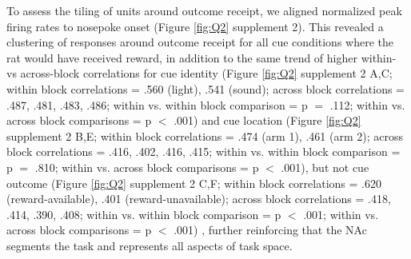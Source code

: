 \documentclass[11pt]{article}
\providecommand{\DIFadd}[1]{{\protect\color{red} \sf #1}} %
\providecommand{\DIFdel}[1]{} %
\providecommand{\DIFaddbegin}{} %
\providecommand{\DIFaddend}{} %
\providecommand{\DIFdelbegin}{} %
\providecommand{\DIFdelend}{} %
\newcommand{\DIFscaledelfig}{0.5}
\newlength{\DIFdelgraphicswidth} %
\newlength{\DIFdelgraphicsheight} %
\newcommand{\DIFaddincludegraphics}[2][]{{\color{red}\fbox{\DIFOincludegraphics[#1]{#2}}}} %
\newcommand{\DIFdelincludegraphics}[2][]{%
\sbox{\DIFdelgraphicsbox}{\DIFOincludegraphics[#1]{#2}}%
\settoboxwidth{\DIFdelgraphicswidth}{\DIFdelgraphicsbox} %
\settoboxtotalheight{\DIFdelgraphicsheight}{\DIFdelgraphicsbox} %
\scalebox{\DIFscaledelfig}{%
\parbox[b]{\DIFdelgraphicswidth}{\usebox{\DIFdelgraphicsbox}\\[-\baselineskip] \rule{\DIFdelgraphicswidth}{0em}}\llap{\resizebox{\DIFdelgraphicswidth}{\DIFdelgraphicsheight}{%
\setlength{\unitlength}{\DIFdelgraphicswidth}%
\begin{picture}(1,1)%
\thicklines\linethickness{2pt} %
{\color[rgb]{1,0,0}\put(0,0){\framebox(1,1){}}}%
{\color[rgb]{1,0,0}\put(0,0){\line( 1,1){1}}}%
{\color[rgb]{1,0,0}\put(0,1){\line(1,-1){1}}}%
\end{picture}%
}\hspace*{3pt}}} %
} %
\DeclareRobustCommand{\DIFaddbegin}{\DIFOaddbegin \let\includegraphics\DIFaddincludegraphics} %
\DeclareRobustCommand{\DIFaddend}{\DIFOaddend \let\includegraphics\DIFOincludegraphics} %
\DeclareRobustCommand{\DIFdelbegin}{\DIFOdelbegin \let\includegraphics\DIFdelincludegraphics} %
\DeclareRobustCommand{\DIFdelend}{\DIFOaddend \let\includegraphics\DIFOincludegraphics} %
\begin{document}
\DIFadd{To assess the tiling of units around outcome receipt, we aligned }\DIFaddend normalized peak firing rates to nosepoke onset \DIFdelbegin \DIFdel{, }\DIFdelend \DIFaddbegin \DIFadd{(Figure \ref{fig:Q2} supplement 2). This }\DIFaddend revealed a clustering of responses around outcome receipt for all cue conditions where the rat would have received reward\DIFdelbegin \DIFdel{(Figure \ref{fig:NP_tiling})}\DIFdelend , in addition to the same trend of higher within- vs across-block correlations for cue identity (Figure \DIFdelbegin \DIFdel{\ref{fig:NP_tiling}}\DIFdelend \DIFaddbegin \DIFadd{\ref{fig:Q2} supplement 2 }\DIFaddend A,C; within block correlations = .560 (light), .541 (sound); across block correlations = .487, .481, .483, .486; within \DIFdelbegin \DIFdel{block }\DIFdelend vs. within block comparison = p $=$ .112; within \DIFdelbegin \DIFdel{block }\DIFdelend vs. across block comparisons = p $<$ .001) and cue location (Figure \DIFdelbegin \DIFdel{\ref{fig:NP_tiling}}\DIFdelend \DIFaddbegin \DIFadd{\ref{fig:Q2} supplement 2 }\DIFaddend B,E; within block correlations = .474 (arm 1), .461 (arm 2); across block correlations = .416, .402, .416, .415; within \DIFdelbegin \DIFdel{block }\DIFdelend vs. within block comparison = p $=$ .810; within \DIFdelbegin \DIFdel{block }\DIFdelend vs. across block comparisons = p $<$ .001), but not cue outcome (Figure \DIFdelbegin \DIFdel{\ref{fig:NP_tiling}}\DIFdelend \DIFaddbegin \DIFadd{\ref{fig:Q2} supplement 2 }\DIFaddend C,F; within block correlations = .620 (reward-available), .401 (reward-unavailable); across block correlations = .418, .414, .390, .408; within \DIFdelbegin \DIFdel{block }\DIFdelend vs. within block comparison = p $<$ .001; within \DIFdelbegin \DIFdel{block }\DIFdelend vs. across block comparisons = p $<$ .001)\DIFdelbegin \DIFdel{. To determine whether coding of cue features persisted after the outcome was revealed, a GLM was fit to the firing rates of
cue-modulated units at the time of outcome receipt, during which the cue was
still present. Fitting a GLM revealed 10 units (8\%) where cue outcome accounted
for an average of 32\% of firing rate variance (Table \ref{tbl1}, data not
shown). An absence of cue identity or cue location coding at this level of analysis was observed,
but looking at the data more closely with a sliding window GLM revealed that cue identity, cue location, and cue outcome were encoded throughout time epochs surround cue-onset, nosepoke hold, and outcome receipt,
suggesting that the NAc maintains a representation of these cue features once the rat receives behavioral feedback for its decision (Figure \ref{fig:NP_GLM}E-J)}\DIFdelend \DIFaddbegin \DIFadd{, further reinforcing that the NAc segments the task and represents all aspects of task space}\DIFaddend .
\end{document}
